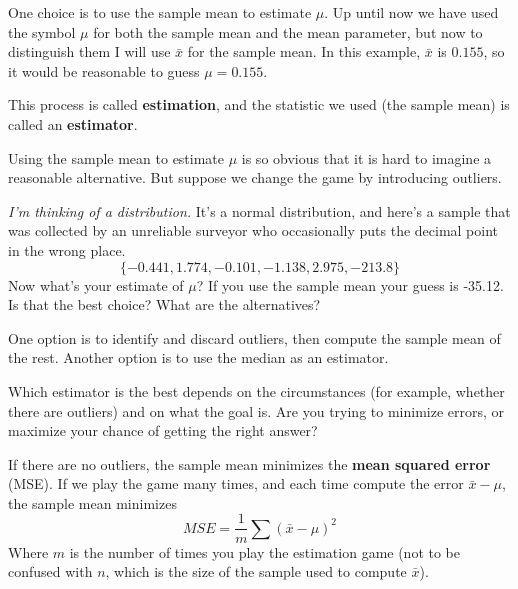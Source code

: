 \documentclass[12pt]{book}
\begin{document}

\newcommand{\xbar}{\bar{x}}
\newcommand{\ybar}{\bar{y}}

One choice is to use the sample mean to estimate $\mu$.  Up
until now we have used the symbol $\mu$ for both the sample mean and
the mean parameter, but now to distinguish them I will use $\xbar$
for the sample mean.  In this example, $\xbar$ is $0.155$, so it would
be reasonable to guess $\mu = 0.155$.

This process is called {\bf estimation}, and the statistic we used
(the sample mean) is called an {\bf estimator}.


Using the sample mean to estimate $\mu$ is so obvious that it is hard
to imagine a reasonable alternative.  But suppose we change the game by
introducing outliers.  


{\em I'm thinking of a distribution.}  It's a normal distribution, and
here's a sample that was collected by an unreliable surveyor who
occasionally puts the decimal point in the wrong place.
%
\[ \{ -0.441, 1.774, -0.101, -1.138, 2.975, -213.8 \} \]
%
Now what's your estimate of $\mu$?  If you use the sample mean your
guess is -35.12.  Is that the best choice?  What are the alternatives?


One option is to identify and discard outliers, then compute the sample
mean of the rest.  Another option is to use the median as an estimator.


Which estimator is the best depends on the circumstances (for example,
whether there are outliers) and on what the goal is.  Are you
trying to minimize errors, or maximize your chance of getting the
right answer?


If there are no outliers, the sample mean minimizes the {\bf mean squared
error} (MSE).  If we play the game many times, and each time
compute the error $\xbar - \mu$, the sample mean minimizes
%
\[ MSE = \frac{1}{m} \sum (\xbar - \mu)^2 \]
%
Where $m$ is the number of times you play the estimation game (not to
be confused with $n$, which is the size of the sample used to compute
$\xbar$). 
\end{document}
